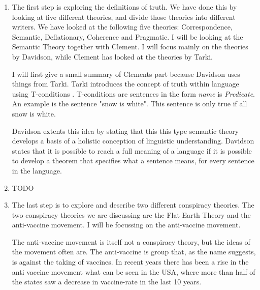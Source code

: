 \documentclass[]{article}
\begin{document}
\begin{enumerate}[a]
    \item The first step is exploring the definitions of truth. We have done this 
    by looking at five different theories, and divide those theories into different
    writers. We have looked at the following five theories: Correspondence, Semantic,
    Deflationary, Coherence and Pragmatic. I will be looking at the Semantic Theory 
    together with Clement. I will focus mainly on the theories by Davidson, while 
    Clement has looked at the theories by Tarki. 

    I will first give a small summary of Clements part because Davidson uses things 
    from Tarki. Tarki introduces the concept of truth within language using 
    T-conditions \cite{Tarski}. T-conditions are sentences in the form \textit{name} is \textit{Predicate}. 
    An example is the sentence "snow is white". This sentence is only true if 
    all snow is white. 

    Davidson extents this idea by stating that this this type semantic theory 
    develops a basis of a holistic conception of linguistic understanding\cite{davidson}.
    Davidson states that it is possible to reach a full meaning of a language if 
    it is possible to develop a theorem that specifies what a sentence means, for 
    every sentence in the language.

    \item TODO
    
    \item The last step is to explore and describe two different conspiracy theories.
    The two conspiracy theories we are discussing are the Flat Earth Theory 
    and the anti-vaccine movement. I will be focussing on the anti-vaccine movement.

    The anti-vaccine movement is itself not a conspiracy theory, but the ideas of 
    the movement often are. The anti-vaccine is group that, as the name suggests,
    is against the taking of vaccines. In recent years there has been a rise in 
    the anti vaccine movement what can be seen in the USA, where more than 
    half of the states saw a decrease in vaccine-rate in the last 10 years\cite{vaccine-drop}.
    

\end{enumerate}
\end{document}
